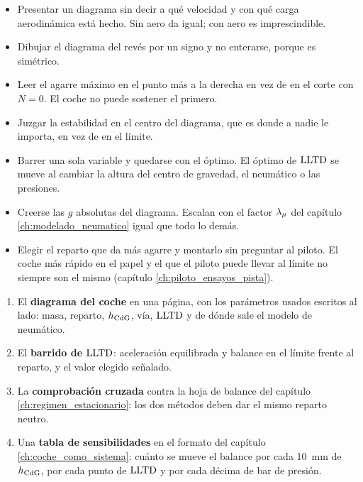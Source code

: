 \begin{ojo}
\begin{itemize}
  \item Presentar un diagrama sin decir a qué velocidad y con qué carga
        aerodinámica está hecho. Sin aero da igual; con aero es imprescindible.
  \item Dibujar el diagrama del revés por un signo y no enterarse, porque es
        simétrico.
  \item Leer el agarre máximo en el punto más a la derecha en vez de en el corte
        con $N = 0$. El coche no puede sostener el primero.
  \item Juzgar la estabilidad en el centro del diagrama, que es donde a nadie le
        importa, en vez de en el límite.
  \item Barrer una sola variable y quedarse con el óptimo. El óptimo de $\mathrm{LLTD}$
        se mueve al cambiar la altura del centro de gravedad, el neumático o las
        presiones.
  \item Creerse las $g$ absolutas del diagrama. Escalan con el factor $\lambda_{\mu}$
        del capítulo \ref{ch:modelado_neumatico} igual que todo lo demás.
  \item Elegir el reparto que da más agarre y montarlo sin preguntar al piloto.
        El coche más rápido en el papel y el que el piloto puede llevar al
        límite no siempre son el mismo (capítulo \ref{ch:piloto_ensayos_pista}).
\end{itemize}
\end{ojo}

\begin{entregable}
\begin{enumerate}
  \item El \textbf{diagrama del coche} en una página, con los parámetros usados
        escritos al lado: masa, reparto, $h_{\mathrm{CdG}}$, vía, $\mathrm{LLTD}$ y de dónde sale el
        modelo de neumático.
  \item El \textbf{barrido de $\mathrm{LLTD}$}: aceleración equilibrada y balance en el
        límite frente al reparto, y el valor elegido señalado.
  \item La \textbf{comprobación cruzada} contra la hoja de balance del capítulo
        \ref{ch:regimen_estacionario}: los dos métodos deben dar el mismo
        reparto neutro.
  \item Una \textbf{tabla de sensibilidades} en el formato del capítulo
        \ref{ch:coche_como_sistema}: cuánto se mueve el balance por cada
        \SI{10}{\milli\meter} de $h_{\mathrm{CdG}}$, por cada punto de $\mathrm{LLTD}$ y por cada
        décima de bar de presión.
\end{enumerate}
\end{entregable}

